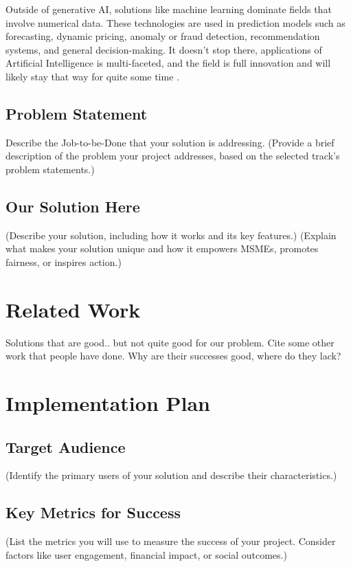 \documentclass{article}
\begin{document}
Outside of generative AI, solutions like machine learning dominate fields that involve numerical data. These technologies are used in prediction models such as forecasting, dynamic pricing, anomaly or fraud detection, recommendation systems, and general decision-making. It doesn't stop there, applications of Artificial Intelligence is multi-faceted, and the field is full innovation and will likely stay that way for quite some time \parencite{bharadiya_machine_2023} \parencite{kaggwa_ai_2024} \parencite{oyekunle_digital_2024}.


\subsection{Problem Statement}
Describe the Job-to-be-Done that your solution is addressing.
(Provide a brief description of the problem your project addresses, based on the selected track's problem statements.)


\subsection{Our Solution Here}
(Describe your solution, including how it works and its key features.)
(Explain what makes your solution unique and how it empowers MSMEs, promotes fairness, or inspires action.)

\section{Related Work}
Solutions that are good.. but not quite good for our problem. Cite some other work that people have done. Why are their successes good, where do they lack?


\section{Implementation Plan}
\subsection{Target Audience}
(Identify the primary users of your solution and describe their characteristics.)
\subsection{Key Metrics for Success}
(List the metrics you will use to measure the success of your project. Consider factors like user engagement, financial impact, or social outcomes.)
\end{document}

